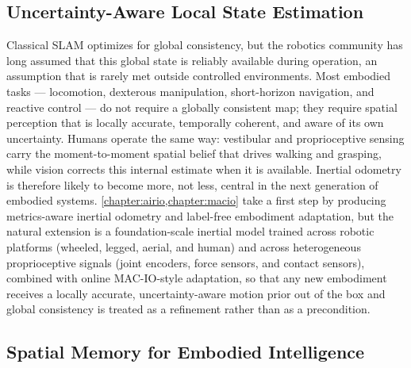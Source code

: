 \subsection{Uncertainty-Aware Local State Estimation}

Classical SLAM optimizes for global consistency, but the robotics community has long assumed that this global state is reliably available during operation, an assumption that is rarely met outside controlled environments.
Most embodied tasks --- locomotion, dexterous manipulation, short-horizon navigation, and reactive control --- do not require a globally consistent map; they require spatial perception that is locally accurate, temporally coherent, and aware of its own uncertainty.
Humans operate the same way: vestibular and proprioceptive sensing carry the moment-to-moment spatial belief that drives walking and grasping, while vision corrects this internal estimate when it is available.
Inertial odometry is therefore likely to become more, not less, central in the next generation of embodied systems.
\cref{chapter:airio,chapter:macio} take a first step by producing metrics-aware inertial odometry and label-free embodiment adaptation, but the natural extension is a foundation-scale inertial model trained across robotic platforms (wheeled, legged, aerial, and human) and across heterogeneous proprioceptive signals (joint encoders, force sensors, and contact sensors), combined with online MAC-IO-style adaptation, so that any new embodiment receives a locally accurate, uncertainty-aware motion prior out of the box and global consistency is treated as a refinement rather than as a precondition.

\subsection{Spatial Memory for Embodied Intelligence}

